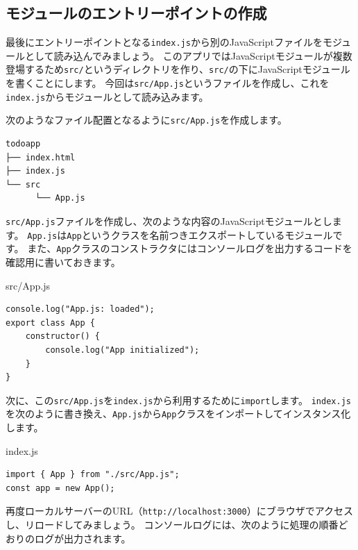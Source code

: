 \hypertarget{module-entry-point}{%
\subsection{モジュールのエントリーポイントの作成}\label{module-entry-point}}

最後にエントリーポイントとなる\texttt{index.js}から別のJavaScriptファイルをモジュールとして読み込んでみましょう。
このアプリではJavaScriptモジュールが複数登場するため\texttt{src/}というディレクトリを作り、\texttt{src/}の下にJavaScriptモジュールを書くことにします。
今回は\texttt{src/App.js}というファイルを作成し、これを\texttt{index.js}からモジュールとして読み込みます。

次のようなファイル配置となるように\texttt{src/App.js}を作成します。

\begin{lstlisting}
todoapp
├── index.html
├── index.js
└── src
      └── App.js
\end{lstlisting}

\texttt{src/App.js}ファイルを作成し、次のような内容のJavaScriptモジュールとします。
\texttt{App.js}は\texttt{App}というクラスを名前つきエクスポートしているモジュールです。
また、\texttt{App}クラスのコンストラクタにはコンソールログを出力するコードを確認用に書いておきます。

\begin{listtitle}
src/App.js
\end{listtitle}
\begin{lstlisting}
console.log("App.js: loaded");
export class App {
    constructor() {
        console.log("App initialized");
    }
}
\end{lstlisting}
\listend

次に、この\texttt{src/App.js}を\texttt{index.js}から利用するために\texttt{import}します。
\texttt{index.js}を次のように書き換え、\texttt{App.js}から\texttt{App}クラスをインポートしてインスタンス化します。

\begin{listtitle}
index.js
\end{listtitle}
\begin{lstlisting}
import { App } from "./src/App.js";
const app = new App();
\end{lstlisting}
\listend

再度ローカルサーバーのURL（\texttt{http://localhost:3000}）にブラウザでアクセスし、リロードしてみましょう。
コンソールログには、次のように処理の順番どおりのログが出力されます。

